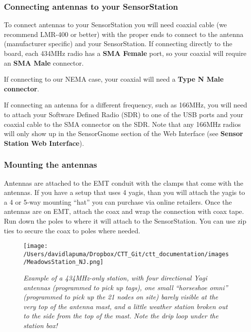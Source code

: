\documentclass[
]{article}
\begin{document}
\hypertarget{connecting-antennas-to-your-sensorstation}{%
\subsubsection{Connecting antennas to your
SensorStation}\label{connecting-antennas-to-your-sensorstation}}

To connect antennas to your SensorStation you will need coaxial cable
(we recommend LMR-400 or better) with the proper ends to connect to the
antenna (manufacturer specific) and your SensorStation. If connecting
directly to the board, each 434MHz radio has a \textbf{SMA Female} port,
so your coaxial will require an \textbf{SMA Male} connector.

If connecting to our NEMA case, your coaxial will need a \textbf{Type N
Male connector}.

If connecting an antenna for a different frequency, such as 166MHz, you
will need to attach your Software Defined Radio (SDR) to one of the USB
ports and your coaxial cable to the SMA connector on the SDR. Note that
any 166MHz radios will only show up in the SensorGnome section of the
Web Interface (see \textbf{Sensor Station Web Interface}).

\hypertarget{mounting-the-antennas}{%
\subsubsection{Mounting the antennas}\label{mounting-the-antennas}}

Antennas are attached to the EMT conduit with the clamps that come with
the antennas. If you have a setup that uses 4 yagis, than you will
attach the yagis to a 4 or 5-way mounting ``hat'' you can purchase via
online retailers. Once the antennas are on EMT, attach the coax and wrap
the connection with coax tape. Run down the poles to where it will
attach to the SensorStation. You can use zip ties to secure the coax to
poles where needed.

\begin{figure}
\hypertarget{id}{%
\centering
\texttt{[image: /Users/davidlapuma/Dropbox/CTT\_Git/ctt\_documentation/images/MeadowsStation\_NJ.png]}
\caption{\emph{Example of a 434MHz-only station, with four directional
Yagi antennas (programmed to pick up tags), one small ``horseshoe omni''
(programmed to pick up the 21 nodes on site) barely visible at the very
top of the antenna mast, and a little weather station broken out to the
side from the top of the mast. Note the drip loop under the station
box!}}\label{id}
}
\end{figure}
\end{document}
